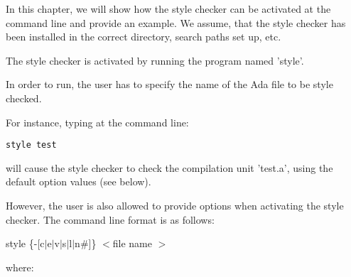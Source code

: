 In this chapter, we will show how the style checker can be activated 
at the command line and provide an example. We assume,
that the style checker has been installed in the correct directory, 
search paths set up, etc.

The style checker is activated by running the program named 'style'.

In order to run, the user has to specify the name of the Ada file to
be style checked.

For instance, typing at the command line:

\begin{center} {\tt style test} \end{center}

will cause the style checker to check the compilation unit 'test.a', using the
default option values (see below).

However, the user is also allowed to provide options when activating
the style checker. The command line format is as follows:


\begin{center}
style \{-[c$|$e$|$v$|$s$|$l$|$n\#]\} $<$file name $>$
\end{center}

where:

